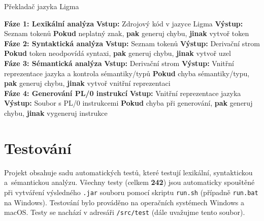 \documentclass[czech, oth, kiv, he, iso690numb, viewonly]{fasthesis}
\begin{document}
    \begin{algorithm}
        \caption{Překladač jazyka Ligma}\label{alg:cap}
        \begin{algorithmic}
            \State \textbf{Fáze 1: Lexikální analýza}
            \State \textbf{Vstup:} Zdrojový kód v jazyce Ligma
            \State \textbf{Výstup:} Seznam tokenů
                \State \textbf{Pokud} neplatný znak, \textbf{pak} generuj chybu, \textbf{jinak} vytvoř token
            \EndFor
            \\
            \State \textbf{Fáze 2: Syntaktická analýza}
            \State \textbf{Vstup:} Seznam tokenů
            \State \textbf{Výstup:} Derivační strom
                \State \textbf{Pokud} token neodpovídá syntaxi, \textbf{pak} generuj chybu, \textbf{jinak} vytvoř uzel
            \EndFor
            \\
            \State \textbf{Fáze 3: Sémantická analýza}
            \State \textbf{Vstup:} Derivační strom
            \State \textbf{Výstup:} Vnitřní reprezentace jazyka a kontrola sémantiky/typů
                \State \textbf{Pokud} chyba sémantiky/typu, \textbf{pak} generuj chybu, \textbf{jinak} vytvoř vnitřní reprezentaci
            \EndFor
            \\
            \State \textbf{Fáze 4: Generování PL/0 instrukcí}
            \State \textbf{Vstup:} Vnitřní reprezentace jazyka
            \State \textbf{Výstup:} Soubor s PL/0 instrukcemi
                \State \textbf{Pokud} chyba při generování, \textbf{pak} generuj chybu, \textbf{jinak} vygeneruj instrukce
            \EndFor
        \end{algorithmic}
    \end{algorithm}

    \chapter{Testování}

    Projekt obsahuje sadu automatických testů, které testují lexikální, syntaktickou a~sémantickou analýzu.
    Všechny testy (celkem \textbf{242}) jsou automaticky spouštěné při vytváření výsledného \texttt{.jar} souboru pomocí skriptu \texttt{run.sh} (případně \texttt{run.bat} na Windows).
    Testování bylo prováděno na operačních systémech Windows a macOS.
    Testy se nachází v adresáři \texttt{/src/test} (dále uvažujme tento soubor).
\end{document}
